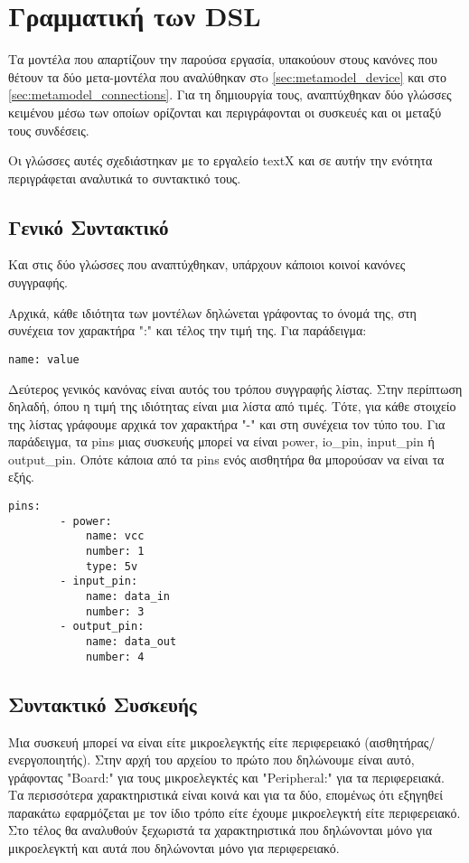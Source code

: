 \section{Γραμματική των DSL}
\label{sec:dsl}

Τα μοντέλα που απαρτίζουν την παρούσα εργασία, υπακούουν στους κανόνες που θέτουν τα δύο μετα-μοντέλα που αναλύθηκαν στo \autoref{sec:metamodel_device} και στο \autoref{sec:metamodel_connections}. Για τη δημιουργία τους, αναπτύχθηκαν δύο γλώσσες κειμένου μέσω των οποίων ορίζονται και περιγράφονται οι συσκευές και οι μεταξύ τους συνδέσεις.

Οι γλώσσες αυτές σχεδιάστηκαν με το εργαλείο textX και σε αυτήν την ενότητα περιγράφεται αναλυτικά το συντακτικό τους.

\subsection{Γενικό Συντακτικό}
\label{subsec:syntax}
Και στις δύο γλώσσες που αναπτύχθηκαν, υπάρχουν κάποιοι κοινοί κανόνες συγγραφής.

Αρχικά, κάθε ιδιότητα των μοντέλων δηλώνεται γράφοντας το όνομά της, στη συνέχεια τον χαρακτήρα ":" και τέλος την τιμή της. Για παράδειγμα:

\begin{lstlisting}[title={Παράδειγμα ανάθεσης τιμής σε ιδιότητα}]
	name: value
\end{lstlisting}

Δεύτερος γενικός κανόνας είναι αυτός του τρόπου συγγραφής λίστας. Στην περίπτωση δηλαδή, όπου η τιμή της ιδιότητας είναι μια λίστα από τιμές. Τότε, για κάθε στοιχείο της λίστας γράφουμε αρχικά τον χαρακτήρα "-" και στη συνέχεια τον τύπο του. Για παράδειγμα, τα pins μιας συσκευής μπορεί να είναι power, io\_pin, input\_pin ή output\_pin. Οπότε κάποια από τα pins ενός αισθητήρα θα μπορούσαν να είναι τα εξής.

\begin{lstlisting}[title={Παράδειγμα ορισμού pins αισθητήρα}]
	pins:
		- power:
			name: vcc
			number: 1
			type: 5v
		- input_pin:
			name: data_in
			number: 3
		- output_pin:
			name: data_out
			number: 4
\end{lstlisting}

\subsection{Συντακτικό Συσκευής}
\label{subsec:syntax_device}

Μια συσκευή μπορεί να είναι είτε μικροελεγκτής είτε περιφερειακό (αισθητήρας/ενεργοποιητής). Στην αρχή του αρχείου το πρώτο που δηλώνουμε είναι αυτό, γράφοντας "Board:" για τους μικροελεγκτές και "Peripheral:" για τα περιφερειακά. Τα περισσότερα χαρακτηριστικά είναι κοινά και για τα δύο, επομένως ότι εξηγηθεί παρακάτω εφαρμόζεται με τον ίδιο τρόπο είτε έχουμε μικροελεγκτή είτε περιφερειακό. Στο τέλος θα αναλυθούν ξεχωριστά τα χαρακτηριστικά που δηλώνονται μόνο για μικροελεγκτή και αυτά που δηλώνονται μόνο για περιφερειακό.

